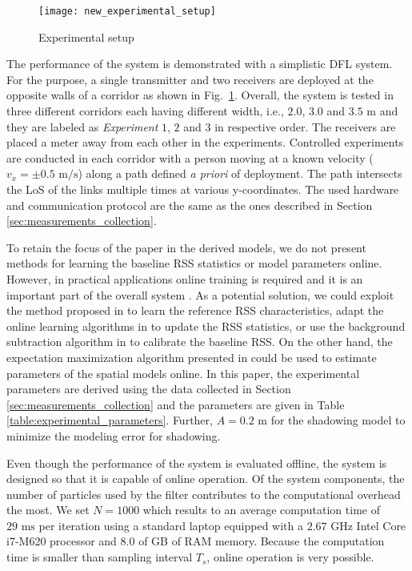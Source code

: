 \documentclass[journal, 10pt, twocolumn, balance]{IEEEtran}
\begin{document}
\begin{figure}[!t]
\begin{centering}
\texttt{[image: new\_experimental\_setup]}
\caption{Experimental setup} 
\label{fig:experimental_setup}
\end{centering}
\end{figure}

The performance of the system is demonstrated with a simplistic DFL system. For the purpose, a single transmitter and two receivers are deployed at the opposite walls of a corridor as shown in Fig.~\ref{fig:experimental_setup}. Overall, the system is tested in three different corridors each having different width, i.e., $2.0$, $3.0$ and $3.5$ m and they are labeled as \emph{Experiment} $1$, $2$ and $3$ in respective order. The receivers are placed a meter away from each other in the experiments. Controlled experiments are conducted in each corridor with a person moving at a known velocity ($v_x = \pm 0.5 \text{ m/s}$) along a path defined \emph{a priori} of deployment. The path intersects the LoS of the links multiple times at various y-coordinates. The used hardware and communication protocol are the same as the ones described in Section \ref{sec:measurements_collection}.

To retain the focus of the paper in the derived models, we do not present methods for learning the baseline RSS statistics or model parameters online. However, in practical applications online training is required and it is an important part of the overall system \cite{Kaltiokallio2012,Zheng2012,edelstein2013}. As a potential solution, we could exploit the method proposed in \cite{Kaltiokallio2012} to learn the reference RSS characteristics, adapt the online learning algorithms in \cite{Zheng2012} to update the RSS statistics, or use the background subtraction algorithm in \cite{edelstein2013} to calibrate the baseline RSS. On the other hand, the expectation maximization algorithm presented in \cite{li2011} could be used to estimate parameters of the spatial models online. In this paper, the experimental parameters are derived using the data collected in Section \ref{sec:measurements_collection} and the parameters are given in Table \ref{table:experimental_parameters}. Further, $A=0.2 \text{ m}$ for the shadowing model to minimize the modeling error for shadowing.

Even though the performance of the system is evaluated offline, the system is designed so that it is capable of online operation. Of the system components, the number of particles used by the filter contributes to the computational overhead the most. We set $N = 1000$ which results to an average computation time of $29 \text{ ms}$ per iteration using a standard laptop equipped with a $2.67$ GHz Intel Core i7-M620 processor and $8.0$ of GB of RAM memory. Because the computation time is smaller than sampling interval $T_s$, online operation is very possible.
\end{document}
